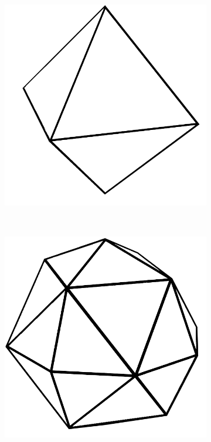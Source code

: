 \begin{figure}
    \centering
    \begin{subfigure}[b]{0.2\textwidth}
        \includegraphics[width=\textwidth]{figures/tessellation/tessellation_htm1.png}
    \end{subfigure}
    ~ %
    \begin{subfigure}[b]{0.2\textwidth}
        \includegraphics[width=\textwidth]{figures/tessellation/tessellation_htm2.png}

\end{subfigure}
\end{figure}
